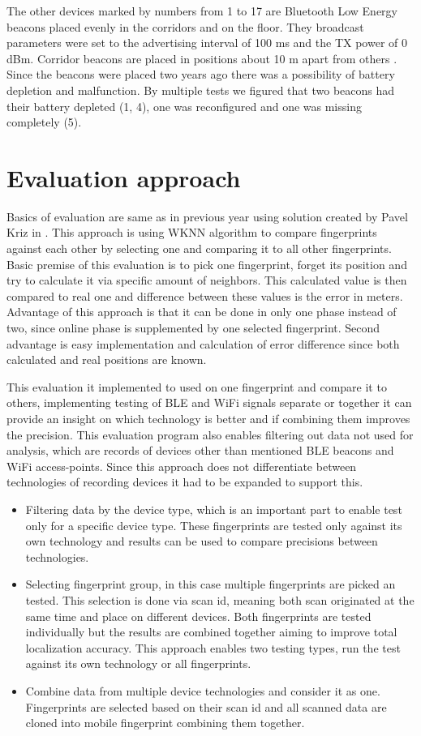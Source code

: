 The other devices marked by numbers from 1 to 17 are Bluetooth Low Energy beacons placed evenly in the corridors and on the floor. They broadcast parameters were set to the advertising interval of 100 ms and the TX power of 0 dBm. Corridor beacons are placed in positions about 10 m apart from others \cite{IILUBLEB}. Since the beacons were placed two years ago there was a possibility of battery depletion and malfunction. By multiple tests we figured that two beacons had their battery depleted (1, 4), one was reconfigured and one was missing completely (5).

\section{Evaluation approach}\label{sec:EvaluationApproach}
Basics of evaluation are same as in previous year using solution created by Pavel Kriz in \cite{IILUBLEB}. This approach is using WKNN algorithm to compare fingerprints against each other by selecting one and comparing it to all other fingerprints. Basic premise of this evaluation is to pick one fingerprint, forget its position and try to calculate it via specific amount of neighbors. This calculated value is then compared to real one and difference between these values is the error in meters. Advantage of this approach is that it can be done in only one phase instead of two, since online phase is supplemented by one selected fingerprint. Second advantage is easy implementation and calculation of error difference since both calculated and real positions are known.

This evaluation it implemented to used on one fingerprint and compare it to others, implementing testing of BLE and WiFi signals separate or together it can provide an insight on which technology is better and if combining them improves the precision. This evaluation program also enables filtering out data not used for analysis, which are records of devices other than mentioned BLE beacons and WiFi access-points. Since this approach does not differentiate between technologies of recording devices it had to be expanded to support this.

\begin{itemize}
	\item Filtering data by the device type, which is an important part to enable test only for a specific device type. These fingerprints are tested only against its own technology and results can be used to compare precisions between technologies.
	\item Selecting fingerprint group, in this case multiple fingerprints are picked an tested. This selection is done via scan id, meaning both scan originated at the same time and place on different devices. Both fingerprints are tested individually but the results are combined together aiming to improve total localization accuracy. This approach enables two testing types, run the test against its own technology or all fingerprints.
	\item Combine data from multiple device technologies and consider it as one. Fingerprints are selected based on their scan id and all scanned data are cloned into mobile fingerprint combining them together.
\end{itemize}


